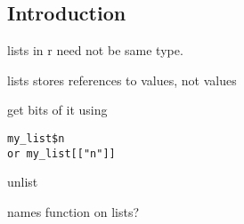 
\subsection{Introduction}

lists in r need not be same type.

lists stores references to values, not values

get bits of it using
\begin{verbatim}
my_list$n
or my_list[["n"]]
\end{verbatim}

unlist

names function on lists?


